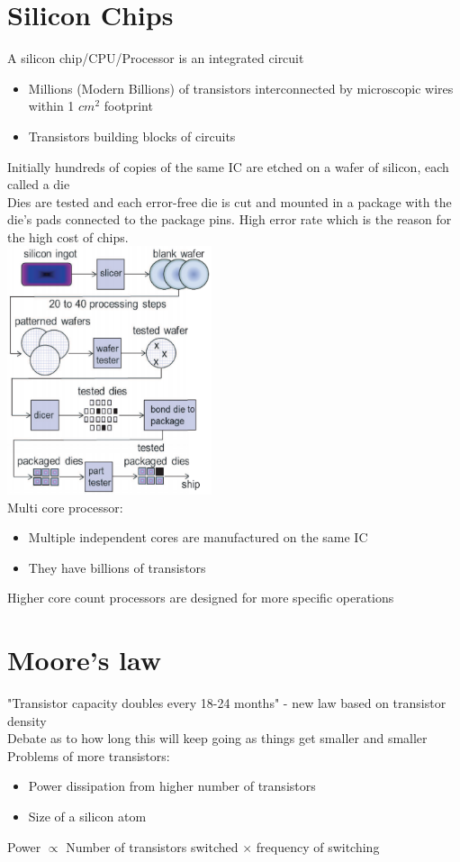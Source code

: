 \documentclass{article}[18pt]
\begin{document}
\section{Silicon Chips}
A silicon chip/CPU/Processor is an integrated circuit
\begin{itemize}
\item Millions (Modern Billions) of transistors interconnected by microscopic wires within 1 $cm^2$ footprint
\item Transistors building blocks of circuits
\end{itemize}
Initially hundreds of copies of the same IC are etched on a wafer of silicon, each called a die\\
Dies are tested and each error-free die is cut and mounted in a package with the die's pads connected to the package pins. High error rate which is the reason for the high cost of chips.\\
\includegraphics[width=6cm]{CPU_creation.png}
\\
Multi core processor:
\begin{itemize}
\item Multiple independent cores are manufactured on the same IC
\item They have billions of transistors
\end{itemize}
Higher core count processors are designed for more specific operations
\section{Moore's law}
"Transistor capacity doubles every 18-24 months" - new law based on transistor density\\
Debate as to how long this will keep going as things get smaller and smaller\\
Problems of more transistors:
\begin{itemize}
\item Power dissipation from higher number of transistors
\item Size of a silicon atom
\end{itemize}
Power $\propto$ Number of transistors switched $\times$ frequency of switching
\end{document}
